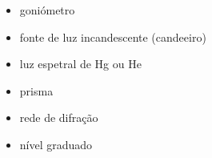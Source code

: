 \documentclass[a4paper,12pt]{article}      %
\begin{document}




\begin{itemize}
\item goniómetro
\item fonte de luz incandescente (candeeiro)
\item luz espetral de Hg ou He
\item prisma
\item rede de difração
\item nível graduado
\end{itemize}




\end{document}
